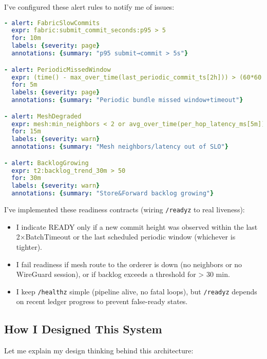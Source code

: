 \documentclass[12pt]{article}
\begin{document}
I've configured these alert rules to notify me of issues:

\begin{lstlisting}[language=yaml, basicstyle=\footnotesize\ttfamily]
- alert: FabricSlowCommits
  expr: fabric:submit_commit_seconds:p95 > 5
  for: 10m
  labels: {severity: page}
  annotations: {summary: "p95 submit→commit > 5s"}

- alert: PeriodicMissedWindow
  expr: (time() - max_over_time(last_periodic_commit_ts[2h])) > (60*60 + 5)
  for: 5m
  labels: {severity: page}
  annotations: {summary: "Periodic bundle missed window+timeout"}

- alert: MeshDegraded
  expr: mesh:min_neighbors < 2 or avg_over_time(per_hop_latency_ms[5m]) > 8
  for: 15m
  labels: {severity: warn}
  annotations: {summary: "Mesh neighbors/latency out of SLO"}

- alert: BacklogGrowing
  expr: t2:backlog_trend_30m > 50
  for: 30m
  labels: {severity: warn}
  annotations: {summary: "Store&Forward backlog growing"}
\end{lstlisting}

I've implemented these readiness contracts (wiring \texttt{/readyz} to real liveness):

\begin{itemize}
\item I indicate READY only if a new commit height was observed within the last 2×BatchTimeout or the last scheduled periodic window (whichever is tighter).
\item I fail readiness if mesh route to the orderer is down (no neighbors or no WireGuard session), or if backlog exceeds a threshold for > 30 min.
\item I keep \texttt{/healthz} simple (pipeline alive, no fatal loops), but \texttt{/readyz} depends on recent ledger progress to prevent false-ready states.
\end{itemize}

\subsection{How I Designed This System}

Let me explain my design thinking behind this architecture:
\end{document}
